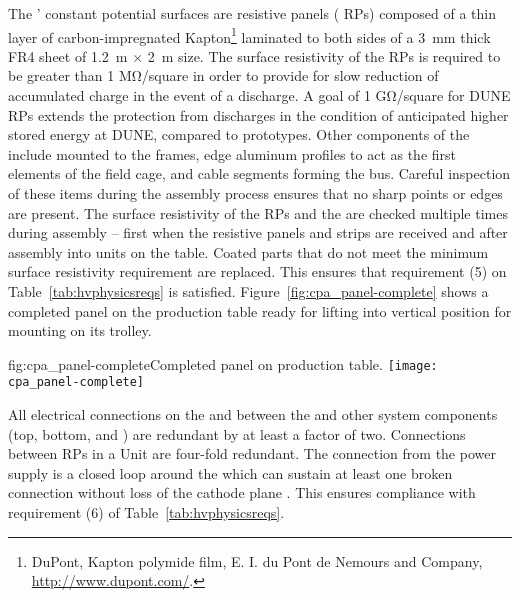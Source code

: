 The ' constant potential surfaces are resistive panels ( RPs) composed of a thin layer of carbon-impregnated Kapton\footnote{DuPont\texttrademark{}, Kapton\textsuperscript{\textregistered} polymide film,  E. I. du Pont de Nemours and Company,  \url{http://www.dupont.com/}.} 
 laminated to both sides of a \SI{3}{\milli\meter} thick FR4 sheet of \SI{1.2}{\meter}  $\times$ \SI{2}{\meter} size.  The surface resistivity of the  RPs is required to be greater than 1 M\si{\ohm}/square in order to provide for slow reduction of accumulated charge in the event of a discharge.  A goal of 1 G\si{\ohm}/square for DUNE  RPs extends the protection from discharges in the condition of anticipated higher stored energy at DUNE, compared to prototypes. Other  components of the  include  mounted to the  frames, edge aluminum profiles to act as the first elements of the field cage, and cable segments forming the  bus. Careful inspection of these items during the assembly process ensures that no sharp points or edges are present. The surface resistivity of the  RPs and the  are checked multiple times during assembly -- first when the resistive panels and strips are received and after assembly into  units on the table.  Coated parts that do not meet the minimum surface resistivity requirement are replaced.  This ensures that requirement (5) on Table~\ref{tab:hvphysicsreqs} is satisfied.  Figure~\ref{fig:cpa_panel-complete} shows a completed   panel on the production table ready for lifting into vertical position for mounting on its trolley.

\begin{dunefigure}{fig:cpa_panel-complete}{Completed   panel on production table.}
\texttt{[image: cpa\_panel-complete]}
\end{dunefigure}

All electrical connections on the  and between the  and other  system components (top, bottom, and ) are redundant by at least a factor of two.  Connections between RPs in a  Unit are four-fold redundant.  The  connection from the  power supply is a closed loop around the  which can sustain at least one broken connection without loss of the cathode plane .  This ensures compliance with %
requirement (6) of Table~\ref{tab:hvphysicsreqs}.

